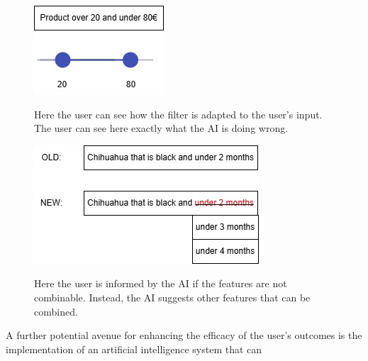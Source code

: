 \documentclass[../../submission.tex]{subfiles}
\begin{document}
 \begin{figure}[h]
     \centering
     \begin{minipage}{0.35\textwidth}
         \includegraphics[width=\textwidth]{images/filter}
         \caption{Here the user can see how the filter is adapted to the user's input. The user can see here exactly what the AI is doing wrong.}
         \Description{}
         \label{fig:filter}
     \end{minipage}
     \hfill
     \begin{minipage}{0.55\textwidth}
         \includegraphics[width=\textwidth]{images/vorschlag}
         \caption{Here the user is informed by the AI if the features are not combinable. Instead, the AI suggests other features that can be combined.}
         \Description{}
         \label{fig:suggestions}
     \end{minipage}
 \end{figure}
 A further potential avenue for enhancing the efficacy of the user's 
 outcomes is the implementation of an artificial intelligence system that can 
\end{document}
